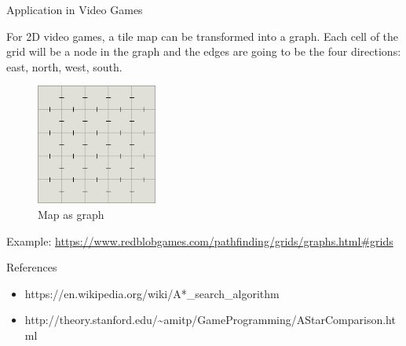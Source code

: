 \documentclass[ignorenonframetext,]{beamer}
\providecommand{\tightlist}{%
  \setlength{\itemsep}{0pt}\setlength{\parskip}{0pt}}
\begin{document}
\begin{frame}{Application in Video Games}
\protect\hypertarget{application-in-video-games}{}

For 2D video games, a tile map can be transformed into a graph. Each
cell of the grid will be a node in the graph and the edges are going to
be the four directions: east, north, west, south.

\begin{figure}
\centering
\includegraphics[width=\textwidth,height=1.5625in]{map-as-graph.png}
\caption{Map as graph}
\end{figure}

Example:
\url{https://www.redblobgames.com/pathfinding/grids/graphs.html\#grids}

\end{frame}

\begin{frame}{References}
\protect\hypertarget{references}{}

\begin{itemize}
\tightlist
\item
  https://en.wikipedia.org/wiki/A*\_search\_algorithm
\item
  http://theory.stanford.edu/\textasciitilde{}amitp/GameProgramming/AStarComparison.html
\end{itemize}

\end{frame}
\end{document}
